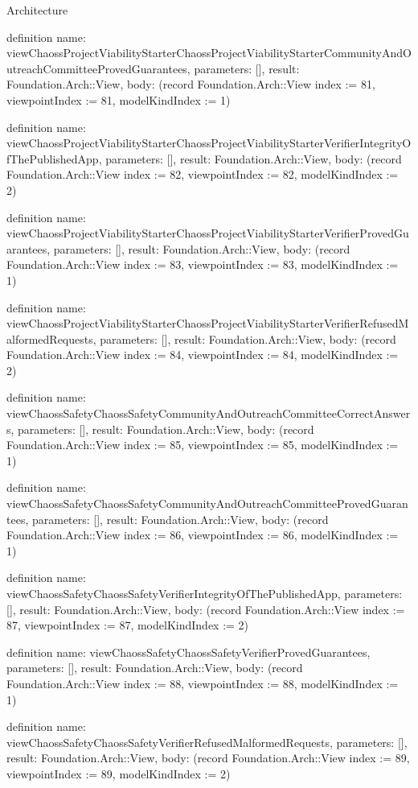 \begin{lexlean}{Architecture}
\begin{semanticmodule}
definition{
  name: viewChaossProjectViabilityStarterChaossProjectViabilityStarterCommunityAndOutreachCommitteeProvedGuarantees,
  parameters: [],
  result: Foundation.Arch::View,
  body: (record Foundation.Arch::View {index := 81, viewpointIndex := 81, modelKindIndex := 1})
}

definition{
  name: viewChaossProjectViabilityStarterChaossProjectViabilityStarterVerifierIntegrityOfThePublishedApp,
  parameters: [],
  result: Foundation.Arch::View,
  body: (record Foundation.Arch::View {index := 82, viewpointIndex := 82, modelKindIndex := 2})
}

definition{
  name: viewChaossProjectViabilityStarterChaossProjectViabilityStarterVerifierProvedGuarantees,
  parameters: [],
  result: Foundation.Arch::View,
  body: (record Foundation.Arch::View {index := 83, viewpointIndex := 83, modelKindIndex := 1})
}

definition{
  name: viewChaossProjectViabilityStarterChaossProjectViabilityStarterVerifierRefusedMalformedRequests,
  parameters: [],
  result: Foundation.Arch::View,
  body: (record Foundation.Arch::View {index := 84, viewpointIndex := 84, modelKindIndex := 2})
}

definition{
  name: viewChaossSafetyChaossSafetyCommunityAndOutreachCommitteeCorrectAnswers,
  parameters: [],
  result: Foundation.Arch::View,
  body: (record Foundation.Arch::View {index := 85, viewpointIndex := 85, modelKindIndex := 1})
}

definition{
  name: viewChaossSafetyChaossSafetyCommunityAndOutreachCommitteeProvedGuarantees,
  parameters: [],
  result: Foundation.Arch::View,
  body: (record Foundation.Arch::View {index := 86, viewpointIndex := 86, modelKindIndex := 1})
}

definition{
  name: viewChaossSafetyChaossSafetyVerifierIntegrityOfThePublishedApp,
  parameters: [],
  result: Foundation.Arch::View,
  body: (record Foundation.Arch::View {index := 87, viewpointIndex := 87, modelKindIndex := 2})
}

definition{
  name: viewChaossSafetyChaossSafetyVerifierProvedGuarantees,
  parameters: [],
  result: Foundation.Arch::View,
  body: (record Foundation.Arch::View {index := 88, viewpointIndex := 88, modelKindIndex := 1})
}

definition{
  name: viewChaossSafetyChaossSafetyVerifierRefusedMalformedRequests,
  parameters: [],
  result: Foundation.Arch::View,
  body: (record Foundation.Arch::View {index := 89, viewpointIndex := 89, modelKindIndex := 2})
}


\end{semanticmodule}
\end{lexlean}
